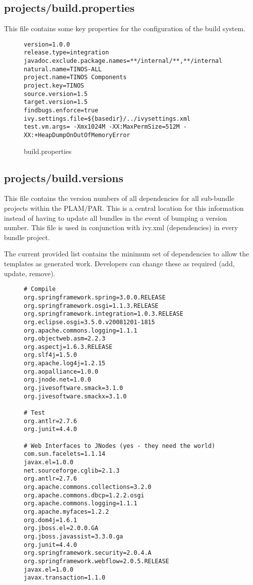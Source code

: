 \subsection{projects/build.properties}
This file contains some key properties for the configuration of the build system.
\begin{figure}[H]
\begin{verbatim}
version=1.0.0
release.type=integration
javadoc.exclude.package.names=**/internal/**,**/internal
natural.name=TINOS-ALL
project.name=TINOS Components
project.key=TINOS
source.version=1.5
target.version=1.5
findbugs.enforce=true
ivy.settings.file=${basedir}/../ivysettings.xml
test.vm.args= -Xmx1024M -XX:MaxPermSize=512M -XX:+HeapDumpOnOutOfMemoryError
\end{verbatim}
\caption{build.properties}
\end{figure}

\subsection{projects/build.versions}
This file contains the version numbers of all dependencies for all sub-bundle projects
within the PLAM/PAR. This is a central location for this information instead of having to update
all bundles in the event of bumping a version number. This file is used in conjunction with
ivy.xml (dependencies) in every bundle project.

The current provided list contains the minimum set of dependencies to allow the templates as
generated work. Developers can change these as required (add, update, remove).
\begin{figure}[H]
\begin{verbatim}
# Compile
org.springframework.spring=3.0.0.RELEASE
org.springframework.osgi=1.1.3.RELEASE
org.springframework.integration=1.0.3.RELEASE
org.eclipse.osgi=3.5.0.v20081201-1815
org.apache.commons.logging=1.1.1
org.objectweb.asm=2.2.3
org.aspectj=1.6.3.RELEASE
org.slf4j=1.5.0
org.apache.log4j=1.2.15
org.aopalliance=1.0.0
org.jnode.net=1.0.0
org.jivesoftware.smack=3.1.0
org.jivesoftware.smackx=3.1.0

# Test
org.antlr=2.7.6
org.junit=4.4.0

# Web Interfaces to JNodes (yes - they need the world)
com.sun.facelets=1.1.14
javax.el=1.0.0
net.sourceforge.cglib=2.1.3
org.antlr=2.7.6
org.apache.commons.collections=3.2.0
org.apache.commons.dbcp=1.2.2.osgi
org.apache.commons.logging=1.1.1
org.apache.myfaces=1.2.2
org.dom4j=1.6.1
org.jboss.el=2.0.0.GA
org.jboss.javassist=3.3.0.ga
org.junit=4.4.0
org.springframework.security=2.0.4.A
org.springframework.webflow=2.0.5.RELEASE
javax.el=1.0.0
javax.transaction=1.1.0
\end{verbatim}
\end{figure}

